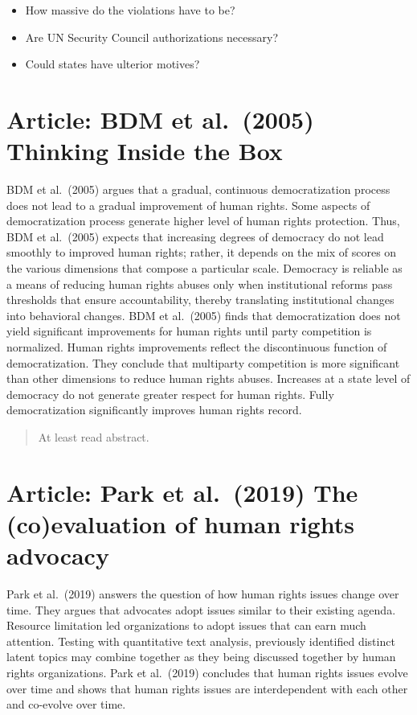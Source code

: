 \documentclass[
]{book}
\begin{document}
\begin{itemize}
\item
  How massive do the violations have to be?
\item
  Are UN Security Council authorizations necessary?
\item
  Could states have ulterior motives?
\end{itemize}

\hypertarget{article-bdm-et-al.-2005-thinking-inside-the-box}{%
\section{Article: BDM et al.~(2005) Thinking Inside the Box}\label{article-bdm-et-al.-2005-thinking-inside-the-box}}

BDM et al.~(2005) argues that a gradual, continuous democratization process does not lead to a gradual improvement of human rights. Some aspects of democratization process generate higher level of human rights protection. Thus, BDM et al.~(2005) expects that increasing degrees of democracy do not lead smoothly to improved human rights; rather, it depends on the mix of scores on the various dimensions that compose a particular scale. Democracy is reliable as a means of reducing human rights abuses only when institutional reforms pass thresholds that ensure accountability, thereby translating institutional changes into behavioral changes. BDM et al.~(2005) finds that democratization does not yield significant improvements for human rights until party competition is normalized. Human rights improvements reflect the discontinuous function of democratization. They conclude that multiparty competition is more significant than other dimensions to reduce human rights abuses. Increases at a state level of democracy do not generate greater respect for human rights. Fully democratization significantly improves human rights record.

\begin{quote}
At least read abstract.
\end{quote}

\hypertarget{article-park-et-al.-2019-the-coevaluation-of-human-rights-advocacy}{%
\section{Article: Park et al.~(2019) The (co)evaluation of human rights advocacy}\label{article-park-et-al.-2019-the-coevaluation-of-human-rights-advocacy}}

Park et al.~(2019) answers the question of how human rights issues change over time. They argues that advocates adopt issues similar to their existing agenda. Resource limitation led organizations to adopt issues that can earn much attention. Testing with quantitative text analysis, previously identified distinct latent topics may combine together as they being discussed together by human rights organizations. Park et al.~(2019) concludes that human rights issues evolve over time and shows that human rights issues are interdependent with each other and co-evolve over time.
\end{document}
